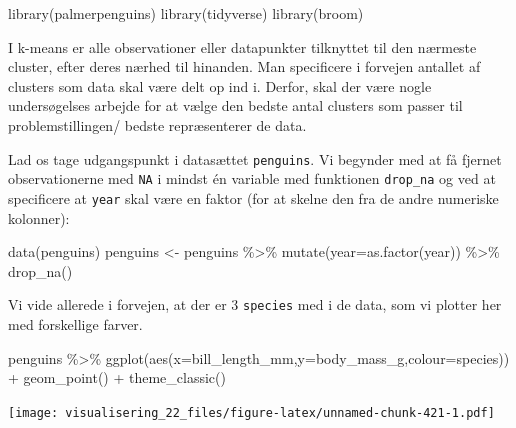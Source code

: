 \documentclass[
]{book}
\newenvironment{Shaded}{\begin{snugshade}}{\end{snugshade}}
\newcommand{\AttributeTok}[1]{\textcolor[rgb]{0.77,0.63,0.00}{#1}}
\newcommand{\FunctionTok}[1]{\textcolor[rgb]{0.00,0.00,0.00}{#1}}
\newcommand{\NormalTok}[1]{#1}
\newcommand{\OtherTok}[1]{\textcolor[rgb]{0.56,0.35,0.01}{#1}}
\newcommand{\SpecialCharTok}[1]{\textcolor[rgb]{0.00,0.00,0.00}{#1}}
\begin{document}
\begin{Shaded}
\begin{Highlighting}[]
\FunctionTok{library}\NormalTok{(palmerpenguins)}
\FunctionTok{library}\NormalTok{(tidyverse)}
\FunctionTok{library}\NormalTok{(broom)}
\end{Highlighting}
\end{Shaded}

I k-means er alle observationer eller datapunkter tilknyttet til den nærmeste cluster, efter deres nærhed til hinanden. Man specificere i forvejen antallet af clusters som data skal være delt op ind i. Derfor, skal der være nogle undersøgelses arbejde for at vælge den bedste antal clusters som passer til problemstillingen/ bedste repræsenterer de data.

Lad os tage udgangspunkt i datasættet \texttt{penguins}. Vi begynder med at få fjernet observationerne med \texttt{NA} i mindst én variable med funktionen \texttt{drop\_na} og ved at specificere at \texttt{year} skal være en faktor (for at skelne den fra de andre numeriske kolonner):

\begin{Shaded}
\begin{Highlighting}[]
\FunctionTok{data}\NormalTok{(penguins)}
\NormalTok{penguins }\OtherTok{\textless{}{-}}\NormalTok{ penguins }\SpecialCharTok{\%\textgreater{}\%} 
  \FunctionTok{mutate}\NormalTok{(}\AttributeTok{year=}\FunctionTok{as.factor}\NormalTok{(year)) }\SpecialCharTok{\%\textgreater{}\%}
  \FunctionTok{drop\_na}\NormalTok{() }
\end{Highlighting}
\end{Shaded}

Vi vide allerede i forvejen, at der er 3 \texttt{species} med i de data, som vi plotter her med forskellige farver.

\begin{Shaded}
\begin{Highlighting}[]
\NormalTok{penguins }\SpecialCharTok{\%\textgreater{}\%} \FunctionTok{ggplot}\NormalTok{(}\FunctionTok{aes}\NormalTok{(}\AttributeTok{x=}\NormalTok{bill\_length\_mm,}\AttributeTok{y=}\NormalTok{body\_mass\_g,}\AttributeTok{colour=}\NormalTok{species)) }\SpecialCharTok{+} 
  \FunctionTok{geom\_point}\NormalTok{() }\SpecialCharTok{+} 
  \FunctionTok{theme\_classic}\NormalTok{()}
\end{Highlighting}
\end{Shaded}

\texttt{[image: visualisering\_22\_files/figure-latex/unnamed-chunk-421-1.pdf]}
\end{document}
